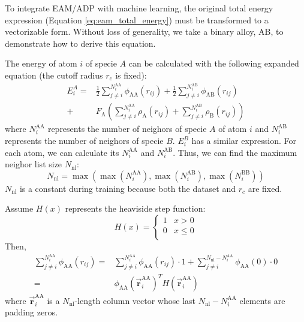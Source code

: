 \documentclass[prb,reprint]{revtex4-2}
\begin{document}
To integrate EAM/ADP with machine learning, the original total energy expression 
(Equation \ref{eq:eam_total_energy}) must be transformed to a vectorizable form. 
Without loss of generality, we take a binary alloy, AB, to demonstrate how to 
derive this equation.

\newcommand{\niaa}{N_{i}^{\mathrm{AA}}}
\newcommand{\niab}{N_{i}^{\mathrm{AB}}}
\newcommand{\nibb}{N_{i}^{\mathrm{BB}}}
\newcommand{\niba}{N_{i}^{\mathrm{BA}}}
\newcommand{\riaa}{\vec{\mathbf{r}}_{i}^{\mathrm{AA}}}
\newcommand{\riab}{\vec{\mathbf{r}}_{i}^{\mathrm{AB}}}
\newcommand{\ribb}{\vec{\mathbf{r}}_{i}^{\mathrm{BB}}}
\newcommand{\riba}{\vec{\mathbf{r}}_{i}^{\mathrm{BA}}}
\newcommand{\namax}{N_{\mathrm{A}}^{\mathrm{max}}}
\newcommand{\nbmax}{N_{\mathrm{B}}^{\mathrm{max}}}
\newcommand{\nnl}{N_{\mathrm{nl}}}

The energy of atom $i$ of specie $A$ can be calculated with the following 
expanded equation (the cutoff radius $r_c$ is fixed):
\begin{align}
\label{eq:e_atom_phase_1}
E_{i}^{A} 
= & 
\frac{1}{2}\sum_{j\neq i}^{\niaa}\phi_{\mathrm{AA}}(r_{ij}) +
\frac{1}{2}\sum_{j\neq i}^{\niab}\phi_{\mathrm{AB}}(r_{ij}) \nonumber \\
+ & F_{\mathrm{A}}\left(
    \sum_{j\neq i}^{\niaa}{\rho_{\mathrm{A}}(r_{ij})} +
    \sum_{j\neq i}^{\niab}{\rho_{\mathrm{B}}(r_{ij})} 
\right)
\end{align}
where $\niaa$ represents the number of neighors of specie $A$ of atom $i$ and 
$\niab$ represents the number of neighors of specie $B$. $E_{i}^{B}$ has a 
similar expression. For each atom, we can calculate its $\niaa$ and $\niab$. 
Thus, we can find the maximum neighor list size $\nnl$:
\begin{equation}
\label{eq:nnl}
\nnl = \max{\left(
    \max\left({\niaa}\right), 
    \max\left({\niab}\right),
    \max\left({\nibb}\right)
\right)}
\end{equation}
$\nnl$ is a constant during training because both the dataset and $r_c$ are 
fixed.

Assume $H(x)$ represents the heaviside step function:
\begin{equation}
\label{eq:heaviside}
H(x) = \begin{cases}
    1 & x > 0 \\
    0 & x \leq 0 \\
\end{cases}
\end{equation}
Then,
\begin{align}
\sum_{j\neq i}^{\niaa}\phi_{\mathrm{AA}}(r_{ij}) = &
\sum_{j\neq i}^{\niaa}\phi_{\mathrm{AA}}(r_{ij}) \cdot 1 + 
\sum_{j\neq i}^{\nnl - \niaa}\phi_{\mathrm{AA}}(0) \cdot 0 \nonumber \\
= & \phi_{\mathrm{AA}}(\vec{\mathbf{r}}_{i}^{\mathrm{AA}})^T
H(\vec{\mathbf{r}}_{i}^{\mathrm{AA}})
\end{align}
where $\vec{\mathbf{r}}_{i}^{\mathrm{AA}}$ is a $\nnl$-length column vector 
whose last $\nnl - \niaa$ elements are padding zeros.
\end{document}
